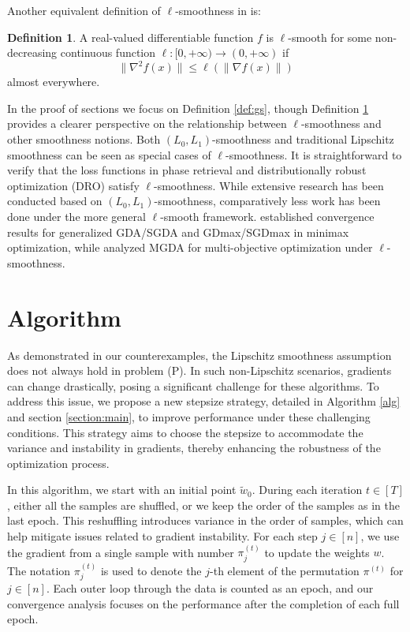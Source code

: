 \documentclass{article} %
\theoremstyle{plain}
\theoremstyle{definition}
\newtheorem{definition}[theorem]{Definition}
\theoremstyle{remark}
\begin{document}
Another equivalent definition of $\ell$-smoothness in \citet{li2023convex} is:

\begin{definition}
\label{def:gs2}
A real-valued differentiable function \( f  \) is \(\ell\)-smooth for some non-decreasing continuous function \( \ell : [0,+\infty) \to (0,+\infty) \) if 
\[
\|\nabla^2 f(x)\| \leq \ell(\|\nabla f(x)\|)
\]
almost everywhere.
\end{definition}

In the proof of sections we focus on Definition \ref{def:gs}, though Definition \ref{def:gs2} provides a clearer perspective on the relationship between \(\ell\)-smoothness and other smoothness notions. Both \((L_0, L_1)\)-smoothness and traditional Lipschitz smoothness can be seen as special cases of \(\ell\)-smoothness. 
It is straightforward to verify that the loss functions in phase retrieval and distributionally robust optimization (DRO) satisfy \(\ell\)-smoothness. 
While extensive research has been conducted based on \((L_0, L_1)\)-smoothness, comparatively less work has been done under the more general \(\ell\)-smooth framework. 
\citet{xiandelving} established convergence results for generalized GDA/SGDA and GDmax/SGDmax in minimax optimization, while \citet{zhang2024convergence} analyzed MGDA for multi-objective optimization under \(\ell\)-smoothness.


\section{Algorithm}\label{sec:alg}

As demonstrated in our counterexamples, the Lipschitz smoothness assumption does not always hold in problem (P). In such non-Lipschitz scenarios, gradients can change drastically, posing a significant challenge for these algorithms. To address this issue, we propose a new stepsize strategy, detailed in Algorithm \ref{alg} and section \ref{section:main}, to improve performance under these challenging conditions. This strategy aims to choose the stepsize to accommodate the variance and instability in gradients, thereby enhancing the robustness of the optimization process.

In this algorithm, we start with an initial point $\tilde{w}_0$. During each iteration $t\in[T]$, either all the samples are shuffled, or we keep the order of the samples as in the last epoch. This reshuffling introduces variance in the order of samples, which can help mitigate issues related to gradient instability. For each step $j\in[n]$, we use the gradient from a single sample with number $\pi^{(t)}_j$ to update the weights $w$. The notation $\pi^{(t)}_j$ is used to denote the $j$-th element of the permutation $\pi^{(t)}$ for $j \in [n]$. Each outer loop through the data is counted as an epoch, and our convergence analysis focuses on the performance after the completion of each full epoch. 
\end{document}
